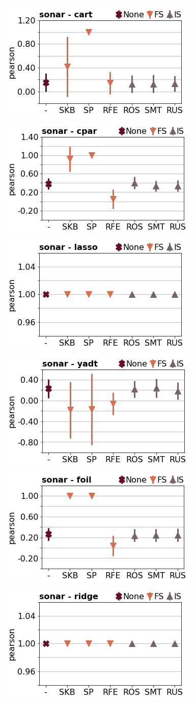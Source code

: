 \documentclass[runningheads,a4paper]{llncs}
\begin{document}
\begin{figure}[!h]
\includegraphics[width=0.32\linewidth]{fig/preps_sonar_DT_sklearn_sample_pearson.png}
\includegraphics[width=0.32\linewidth]{fig/preps_sonar_RB_cpar_sample_pearson.png}
\includegraphics[width=0.32\linewidth]{fig/preps_sonar_LM_lasso_sample_pearson.png}
\includegraphics[width=0.32\linewidth]{fig/preps_sonar_DT_yadt_sample_pearson.png}
\includegraphics[width=0.32\linewidth]{fig/preps_sonar_RB_foil_sample_pearson.png}
\includegraphics[width=0.32\linewidth]{fig/preps_sonar_LM_ridge_sample_pearson.png}
\end{figure}
\end{document}
